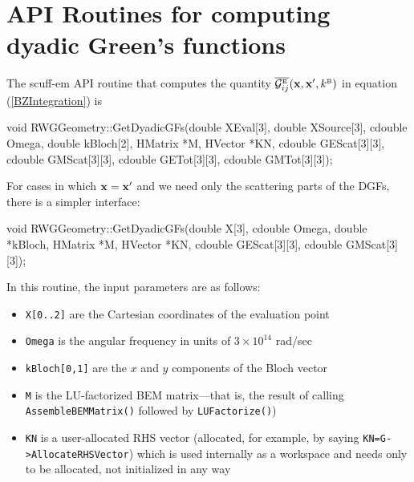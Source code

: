 \documentclass[letterpaper]{article}
\begin{document}
\section{API Routines for computing dyadic Green's functions}

The {\sc scuff-em} API routine that computes the quantity
$\overline{\mathcal{G}^{\hbox{\tiny{E}}}_{ij}}(\mathbf{x}, \mathbf{x}^\prime, k^{\hbox{\tiny{B}}})$
in equation (\ref{BZIntegration}) is 

\smallskip 
\begin{center}
\begin{verbcode}
void RWGGeometry::GetDyadicGFs(double XEval[3], double XSource[3],
                               cdouble Omega, double kBloch[2],
                               HMatrix *M, HVector *KN,
                               cdouble GEScat[3][3],
                               cdouble GMScat[3][3],
                               cdouble GETot[3][3],
                               cdouble GMTot[3][3]);
\end{verbcode}
\end{center}
\smallskip

For cases in which $\mathbf{x}=\mathbf{x}^\prime$ and we need only the 
scattering parts of the DGFs, there is a simpler interface:

\smallskip 
\begin{center}
\begin{verbcode}
void RWGGeometry::GetDyadicGFs(double X[3], cdouble Omega, 
                               double *kBloch,
                               HMatrix *M, HVector *KN,
                               cdouble GEScat[3][3], 
                               cdouble GMScat[3][3]);
\end{verbcode}
\end{center}
\smallskip 

In this routine, the input parameters are as follows:

\begin{itemize}
 \item \texttt{X[0..2]} are the Cartesian coordinates of the evaluation point
 \item \texttt{Omega} is the angular frequency in units of $3\times 10^{14}$ rad/sec
 \item \texttt{kBloch[0,1]} are the $x$ and $y$ components of the Bloch vector
 \item \texttt{M} is the LU-factorized BEM matrix---that is, the result of 
       calling \texttt{AssembleBEMMatrix()} followed by \texttt{LUFactorize()})
 \item \texttt{KN} is a user-allocated RHS vector (allocated, for example,
       by saying \texttt{KN=G->AllocateRHSVector}) which is used internally
       as a workspace and needs only to be allocated, not initialized in any way
\end{itemize}
\end{document}
